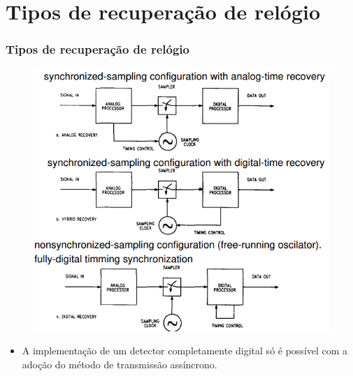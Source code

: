 \section{Tipos de recuperação de relógio}
\begin{frame}[t]
	\frametitle{Tipos de recuperação de relógio}
    \begin{figure}
        \includegraphics[scale=.3]{figs/tipos_de_sinc_de_relogio.png}
    \end{figure}
    \begin{itemize}
        \item A implementação de um detector completamente digital só é possível com a adoção do método de transmissão assíncrono.
    \end{itemize}
\end{frame}

